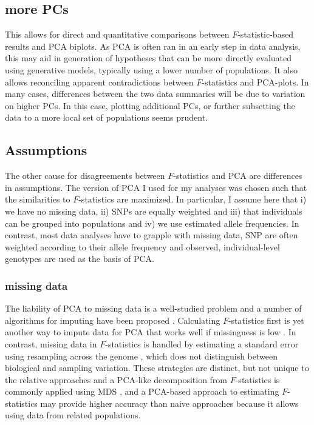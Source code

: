 \documentclass[12pt,fullpage, a4paper]{article}
\begin{document}
\subsection{more PCs}
This allows for direct and quantitative comparisons between $F$-statistic-based results and PCA biplots. As PCA is often ran in an early step in data analysis, this may aid in generation of hypotheses that can be more directly evaluated using generative models, typically using a lower number of populations. It also allows reconciling apparent contradictions between $F$-statistics and PCA-plots. In many cases, differences between the two data summaries will be due to variation on higher PCs. In this case, plotting additional PCs, or further subsetting the data to a more local set of populations seems prudent. 


\subsection{Assumptions}
The other cause for disagreements between $F$-statistics and PCA are differences in assumptions. The version of PCA I used for my analyses was chosen such that the similarities to $F$-statistics are maximized. In particular, I assume here that i) we have no missing data, ii) SNPs are equally weighted and iii) that individuals can be grouped into populations and iv) we use estimated allele frequencies. In contrast, most data analyses have to grapple with missing data, SNP are often weighted according to their allele frequency and observed, individual-level genotypes are used as the basis of PCA.

\subsubsection{missing data}
The liability of PCA to missing data is a well-studied problem and a number of algorithms for imputing have been proposed \citep[e.g.][]{hastie2015, meisner2017, meisner2021}. Calculating $F$-statistics first is yet another way to impute data for PCA that works well if missingness is low \citep{meisner2021}. In contrast, missing data in $F$-statistics is handled by estimating a standard error using resampling across the genome \citep{patterson2012}, which does not distinguish between biological and sampling variation. These strategies are distinct, but not unique to the relative approaches and a PCA-like decomposition from $F$-statistics is commonly applied using MDS \citep[e.g.][]{fu2016}, and a PCA-based approach to estimating $F$-statistics may provide higher accuracy than naive approaches because it allows using data from related populations.
\end{document}
